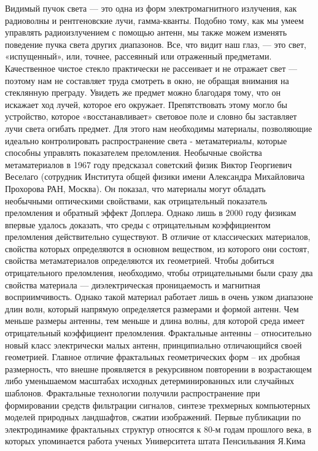 Видимый пучок света — это одна из форм электромагнитного излучения, как радиоволны и рентгеновские лучи, гамма-кванты. Подобно тому, как мы умеем управлять радиоизлучением с помощью антенн, мы также можем изменять поведение пучка света других диапазонов. Все, что видит наш глаз, — это свет, «испущенный», или, точнее, рассеянный или отраженный предметами. Качественное чистое стекло практически не рассеивает и не отражает свет — поэтому нам не составляет труда смотреть в окно, не обращая внимания на стеклянную преграду. Увидеть же предмет можно благодаря тому, что он искажает ход лучей, которое его окружает. Препятствовать этому могло бы устройство, которое «восстанавливает» световое поле и словно бы заставляет лучи света огибать предмет. Для этого нам необходимы материалы, позволяющие идеально контролировать распространение света - метаматериалы, которые способны управлять показателем преломления.
Необычные свойства метаматериалов в 1967 году предсказал советский физик Виктор Георгиевич Веселаго (сотрудник Института общей физики имени Александра Михайловича Прохорова РАН, Москва). Он показал, что материалы могут обладать необычными оптическими свойствами, как отрицательный показатель преломления и обратный эффект Доплера.
Однако лишь в 2000 году физикам впервые удалось доказать, что среды с отрицательным коэффициентом преломления действительно существуют. В отличие от классических материалов, свойства которых определяются в основном веществом, из которого они состоят, свойства метаматериалов определяются их геометрией. Чтобы добиться отрицательного преломления, необходимо, чтобы отрицательными были сразу два свойства материала — диэлектрическая проницаемость и магнитная восприимчивость.
Однако такой материал работает лишь в очень узком диапазоне длин волн, который напрямую определяется размерами и формой антенн. Чем меньше размеры антенны, тем меньше и длина волны, для которой среда имеет отрицательный коэффициент преломления. 
Фрактальные антенны – относительно новый класс электрически малых антенн, принципиально отличающийся своей геометрией. Главное отличие фрактальных геометрических форм – их дробная размерность, что внешне проявляется в рекурсивном повторении в возрастающем либо уменьшаемом масштабах исходных детерминированных или случайных шаблонов. Фрактальные технологии получили распространение при формировании средств фильтрации сигналов, синтезе трехмерных компьютерных моделей природных ландшафтов, сжатии изображений.
Первые публикации по электродинамике фрактальных структур относятся к 80-м годам прошлого века, в которых упоминается работа ученых Университета штата Пенсильвания Я.Кима
